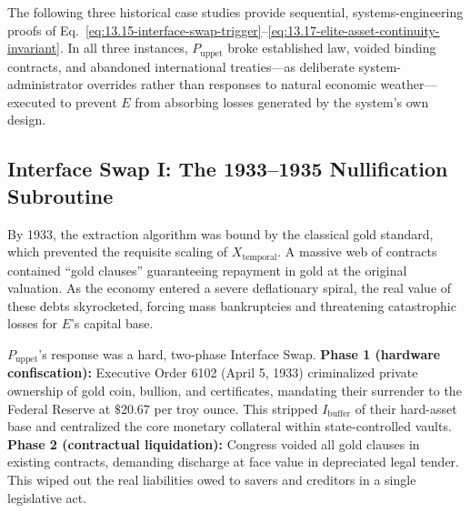 \noindent The following three historical case studies provide sequential, systems-engineering proofs of Eq.~\eqref{eq:13.15-interface-swap-trigger}--\eqref{eq:13.17-elite-asset-continuity-invariant}. In all three instances, $P_{\text{uppet}}$ broke established law, voided binding contracts, and abandoned international treaties---as deliberate system-administrator overrides rather than responses to natural economic weather---executed to prevent $E$ from absorbing losses generated by the system's own design.

\subsection*{Interface Swap I: The 1933--1935 Nullification Subroutine}
\label{subsec:swap_1933}

By 1933, the extraction algorithm was bound by the classical gold standard, which prevented the requisite scaling of $X_{\text{temporal}}$. A massive web of contracts contained ``gold clauses'' guaranteeing repayment in gold at the original valuation. As the economy entered a severe deflationary spiral, the real value of these debts skyrocketed, forcing mass bankruptcies and threatening catastrophic losses for $E$'s capital base.

$P_{\text{uppet}}$'s response was a hard, two-phase Interface Swap. \textbf{Phase 1 (hardware confiscation):} Executive Order 6102 (April 5, 1933) criminalized private ownership of gold coin, bullion, and certificates, mandating their surrender to the Federal Reserve at $\$20.67$ per troy ounce. This stripped $I_{\text{buffer}}$ of their hard-asset base and centralized the core monetary collateral within state-controlled vaults. \textbf{Phase 2 (contractual liquidation):} Congress voided all gold clauses in existing contracts, demanding discharge at face value in depreciated legal tender. This wiped out the real liabilities owed to savers and creditors in a single legislative act.

